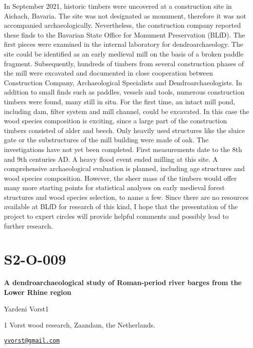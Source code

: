 \documentclass[
]{book}
\begin{document}
In September 2021, historic timbers were uncovered at a construction site in Aichach, Bavaria. The site was not designated as monument, therefore it was not accompanied archaeologically. Nevertheless, the construction company reported these finds to the Bavarian State Office for Monument Preservation (BLfD). The first pieces were examined in the internal laboratory for dendroarchaeology. The site could be identified as an early medieval mill on the basis of a broken paddle fragment. Subsequently, hundreds of timbers from several construction phases of the mill were excavated and documented in close cooperation between Construction Company, Archaeological Specialists and Dendroarchaeologists. In addition to small finds such as paddles, vessels and tools, numerous construction timbers were found, many still in situ. For the first time, an intact mill pond, including dam, filter system and mill channel, could be excavated. In this case the wood species composition is exciting, since a large part of the construction timbers consisted of alder and beech. Only heavily used structures like the sluice gate or the substructures of the mill building were made of oak. The investigations have not yet been completed. First measurements date to the 8th and 9th centuries AD. A heavy flood event ended milling at this site. A comprehensive archaeological evaluation is planned, including age structures and wood species composition. However, the sheer mass of the timbers would offer many more starting points for statistical analyses on early medieval forest structures and wood species selection, to name a few. Since there are no resources available at BLfD for research of this kind, I hope that the presentation of the project to expert circles will provide helpful comments and possibly lead to further research.

\hypertarget{s2-o-009}{%
\section*{S2-O-009}\label{s2-o-009}}

\textbf{A dendroarchaeological study of Roman-period river barges from the Lower Rhine region}

Yardeni Vorst1

1 Vorst wood research, Zaandam, the Netherlands.

\href{mailto:yvorst@gmail.com}{\nolinkurl{yvorst@gmail.com}}
\end{document}
